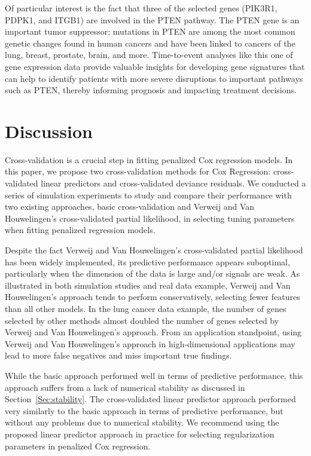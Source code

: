 Of particular interest is the fact that three of the selected genes (PIK3R1, PDPK1, and ITGB1) are involved in the PTEN pathway.  The PTEN gene is an important tumor suppressor; mutations in PTEN are among the most common genetic changes found in human cancers and have been linked to cancers of the lung, breast, prostate, brain, and more.  Time-to-event analyses like this one of gene expression data provide valuable insights for developing gene signatures that can help to identify patients with more severe disruptions to important pathways such as PTEN, thereby informing prognosis and impacting treatment decisions.

\section{Discussion}

Cross-validation is a crucial step in fitting penalized Cox regression models. In this paper, we propose two cross-validation methods for Cox Regression: cross-validated linear predictors and cross-validated deviance residuals. We conducted a series of simulation experiments to study and compare their performance with two existing approaches, basic cross-validation and Verweij and Van Houwelingen's cross-validated partial likelihood, in selecting tuning parameters when fitting penalized regression models.

Despite the fact Verweij and Van Houwelingen's cross-validated partial likelihood has been widely implemented, its predictive performance appears suboptimal, particularly when the dimension of the data is large and/or signals are weak. As illustrated in both simulation studies and real data example, Verweij and Van Houwelingen's approach tends to perform conservatively, selecting fewer features than all other models. In the lung cancer data example, the number of genes selected by other methods almost doubled the number of genes selected by Verweij and Van Houwelingen's approach. From an application standpoint, using Verweij and Van Houwelingen's approach in high-dimensional applications may lead to more false negatives and miss important true findings.

While the basic approach performed well in terms of predictive performance, this approach suffers from a lack of numerical stability as discussed in Section~\ref{Sec:stability}. The cross-validated linear predictor approach performed very similarly to the basic approach in terms of predictive performance, but without any problems due to numerical stability.  We recommend using the proposed linear predictor approach in practice for selecting regularization parameters in penalized Cox regression.


